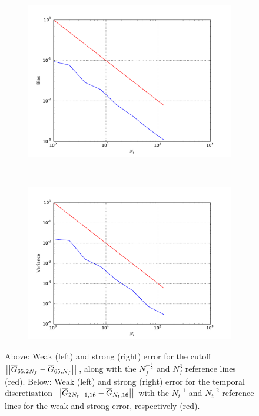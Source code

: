 \documentclass[11pt]{amsart}
\begin{document}
\begin{figure}
\begin{subfigure}[b]{0.4\textwidth}
        \includegraphics[width=\textwidth]{weakerr5.pdf}
    \end{subfigure}
    ~ %
    \begin{subfigure}[b]{0.4\textwidth}
        \includegraphics[width=\textwidth]{strongerr5.pdf}
    \end{subfigure}
    \caption{\label{img:rateFig3} Above: Weak (left) and strong (right) error
    for the cutoff
    $\left| {\left| {{\overline G_{65,2N_f}-\overline G_{65,N_f}}} \right|} \right|_{}$,
    along with the $N_f^{-\frac{3}{2}}$ and $N_f^{3}$ reference lines (red).
    Below: Weak (left) and strong (right) error for the temporal discretisation
    $\left| {\left| {{\overline G_{2N_t-1,16} - \overline G_{N_t,16}}} \right|} \right|_{}$ with the 
    $N_t^{-1}$ and $N_t^{-2}$ reference lines for the weak and strong error,
    respectively (red).}
\end{figure}
\end{document}
